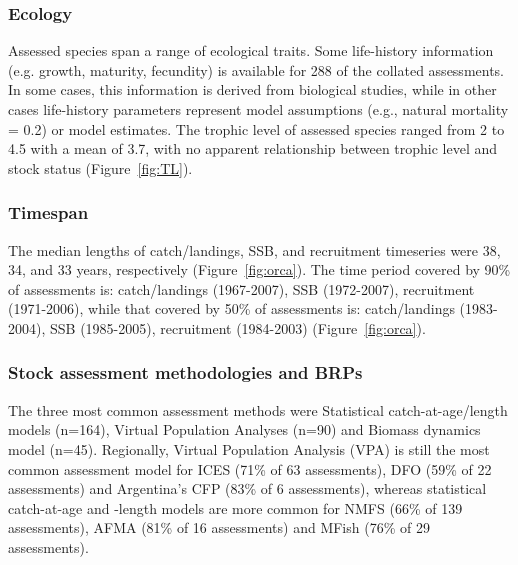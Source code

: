 \subsubsection*{Ecology}
Assessed species span a range of ecological traits. Some life-history
information (e.g. growth, maturity, fecundity) is available for
288 of the collated assessments. In some cases, this
information is derived from biological studies, while in other cases
life-history parameters represent model assumptions (e.g., natural
mortality = 0.2) or model estimates. The trophic level of assessed
species ranged from 2 to 4.5 with a mean of
3.7, with no apparent relationship between trophic level and stock status (Figure~\ref{fig:TL}).




\subsubsection*{Timespan }


The median lengths of catch/landings, SSB, and recruitment timeseries
were 38, 34, and 33
years, respectively (Figure~\ref{fig:orca}).  The time period covered by 90\% of assessments
is: catch/landings (1967-2007), SSB
(1972-2007), recruitment (1971-2006), while that
covered by 50\% of assessments is: catch/landings
(1983-2004), SSB (1985-2005), recruitment
(1984-2003) (Figure~\ref{fig:orca}).

\subsubsection*{Stock assessment methodologies and BRPs}

The three most common assessment methods were
Statistical catch-at-age/length models (n=164), Virtual Population Analyses (n=90) and
Biomass dynamics model (n=45). Regionally, Virtual Population Analysis
(VPA) is still the most common assessment model for ICES
(71\% of 63 assessments), DFO
(59\% of 22 assessments) and Argentina's CFP
(83\% of 6 assessments), whereas statistical
catch-at-age and -length models are more common for NMFS
(66\% of 139 assessments), AFMA
(81\% of 16 assessments) and MFish
(76\% of 29 assessments).


